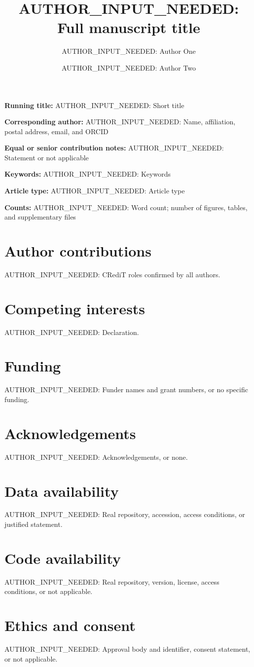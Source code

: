 \documentclass[11pt]{article}
\title{AUTHOR\_INPUT\_NEEDED: Full manuscript title}
\author[1]{AUTHOR\_INPUT\_NEEDED: Author One}
\author[2]{AUTHOR\_INPUT\_NEEDED: Author Two}
\affil[1]{AUTHOR\_INPUT\_NEEDED: Affiliation one}
\affil[2]{AUTHOR\_INPUT\_NEEDED: Affiliation two}
\date{}
\begin{document}
\maketitle

\noindent\textbf{Running title:}
AUTHOR\_INPUT\_NEEDED: Short title

\medskip
\noindent\textbf{Corresponding author:}
AUTHOR\_INPUT\_NEEDED: Name, affiliation, postal address, email, and ORCID

\medskip
\noindent\textbf{Equal or senior contribution notes:}
AUTHOR\_INPUT\_NEEDED: Statement or not applicable

\medskip
\noindent\textbf{Keywords:}
AUTHOR\_INPUT\_NEEDED: Keywords

\medskip
\noindent\textbf{Article type:}
AUTHOR\_INPUT\_NEEDED: Article type

\medskip
\noindent\textbf{Counts:}
AUTHOR\_INPUT\_NEEDED: Word count; number of figures, tables, and supplementary files

\section*{Author contributions}
AUTHOR\_INPUT\_NEEDED: CRediT roles confirmed by all authors.

\section*{Competing interests}
AUTHOR\_INPUT\_NEEDED: Declaration.

\section*{Funding}
AUTHOR\_INPUT\_NEEDED: Funder names and grant numbers, or no specific funding.

\section*{Acknowledgements}
AUTHOR\_INPUT\_NEEDED: Acknowledgements, or none.

\section*{Data availability}
AUTHOR\_INPUT\_NEEDED: Real repository, accession, access conditions, or justified statement.

\section*{Code availability}
AUTHOR\_INPUT\_NEEDED: Real repository, version, license, access conditions, or not applicable.

\section*{Ethics and consent}
AUTHOR\_INPUT\_NEEDED: Approval body and identifier, consent statement, or not applicable.
\end{document}
